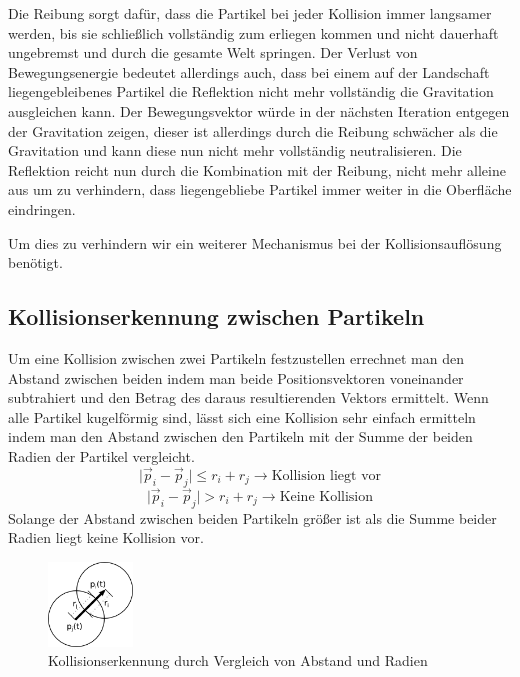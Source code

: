 \begin{Spacing}{\mylinespace}
		Die Reibung sorgt dafür, dass die Partikel bei jeder Kollision immer langsamer
		werden, bis sie schließlich vollständig zum erliegen kommen und
		nicht dauerhaft ungebremst und durch die gesamte Welt springen.
		Der Verlust von Bewegungsenergie bedeutet allerdings auch, dass bei einem auf der
		Landschaft liegengebleibenes Partikel die Reflektion nicht mehr vollständig die
		Gravitation ausgleichen kann. Der Bewegungsvektor würde in der
		nächsten Iteration entgegen der Gravitation zeigen, dieser ist allerdings durch die Reibung
		schwächer als die Gravitation und kann diese nun nicht mehr vollständig neutralisieren. Die Reflektion
		reicht nun durch die Kombination mit der Reibung, nicht mehr alleine aus
		um zu verhindern, dass liegengebliebe Partikel immer weiter in die Oberfläche eindringen.

		Um dies zu verhindern wir ein weiterer Mechanismus bei der Kollisionsauflösung benötigt.



    \subsection{Kollisionserkennung zwischen Partikeln} \label{kollpart}
    	Um eine Kollision zwischen zwei Partikeln festzustellen errechnet man
    	den Abstand zwischen beiden indem man beide Positionsvektoren voneinander
    	subtrahiert und den Betrag des daraus resultierenden Vektors ermittelt.
    	Wenn alle Partikel kugelförmig sind,
    	lässt sich eine Kollision sehr einfach ermitteln indem man den Abstand
    	zwischen den Partikeln mit der Summe der beiden Radien der Partikel vergleicht.
    	\[ \vert \vec{p}_{i} - \vec{p}_{j} \vert \leq r_{i} + r_{j} \rightarrow \textrm{Kollision liegt vor} \]
    	\[ \vert \vec{p}_{i} - \vec{p}_{j} \vert > r_{i} + r_{j} \rightarrow \textrm{Keine Kollision} \]
    	Solange der Abstand zwischen beiden Partikeln größer ist als die Summe beider Radien
    	 liegt keine Kollision vor.
    	 \begin{figure}[h!]
			\centering
			\vspace*{30px}
			\includegraphics[width=0.2\textwidth]{graphics/Phys_kp.png}
			\caption{Kollisionserkennung durch Vergleich von Abstand und Radien}
			\label{fig:partkoll}
		\end{figure}		
		

\end{Spacing}
